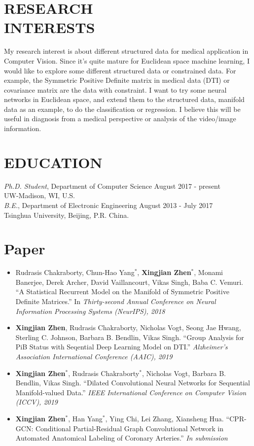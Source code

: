 \documentclass[margin]{res}
\begin{document}
\begin{resume}
\section{RESEARCH \\ INTERESTS}
                My research interest is about different structured data for medical application in Computer Vision. Since it’s quite mature for Euclidean space machine learning, I would like to explore some different structured data or constrained data. For example, the Symmetric Positive Definite matrix in medical data (DTI) or covariance matrix are the data with constraint. I want to try some neural networks in Euclidean space, and extend them to the structured data, manifold data as an example, to do the classification or regression. I believe this will be useful in diagnosis from a medical perspective or analysis of the video/image information.
\section{EDUCATION} 
                {\sl {Ph.D. Student}}, Department of Computer Science \hfill August 2017 - present\\
                UW-Madison, WI, U.S. \\
                {\sl {B.E.}}, Department of Electronic Engineering \hfill August 2013 - July 2017\\
                Tsinghua University, Beijing, P.R. China. 

\section{Paper}
                \begin{itemize}\itemsep -2.2pt
                \item Rudrasis Chakraborty, Chun-Hao Yang$^*$, \textbf{Xingjian Zhen$^*$}, Monami Banerjee, Derek Archer, David Vaillancourt, Vikas Singh, Baba C. Vemuri. ``A Statistical Recurrent Model on the Manifold of Symmetric Positive Definite Matrices.''  In \emph{Thirty-second Annual Conference on Neural Information Processing Systems (NeurIPS), 2018}
                \item \textbf{Xingjian Zhen}, Rudrasis Chakraborty, Nicholas Vogt, Seong Jae Hwang, Sterling C. Johnson, Barbara B. Bendlin, Vikas Singh. ``Group Analysis for PiB Status with Seqential Deep Learning Model on DTI.'' \emph{Alzheimer's Association International Conference (AAIC), 2019}
                \item \textbf{Xingjian Zhen$^*$}, Rudrasis Chakraborty$^*$, Nicholas Vogt, Barbara B. Bendlin, Vikas Singh. ``Dilated Convolutional Neural Networks for Sequential Manifold-valued Data.'' \emph{IEEE International Conference on Computer Vision (ICCV), 2019}
                \item \textbf{Xingjian Zhen$^*$}, Han Yang$^*$, Ying Chi, Lei Zhang, Xiansheng Hua. ``CPR-GCN: Conditional Partial-Residual Graph Convolutional Network in Automated Anatomical Labeling of Coronary Arteries.'' \emph{In submission} 
                \end{itemize}


\end{resume}
\end{document}
